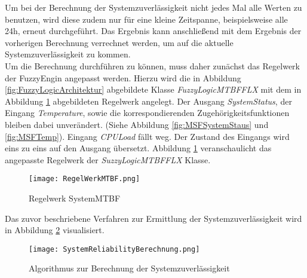Um bei der Berechnung der Systemzuverlässigkeit nicht jedes Mal alle Werten zu benutzen, wird diese zudem nur für eine kleine Zeitspanne, beispielsweise alle 24h, erneut durchgeführt. Das Ergebnis kann anschließend mit dem Ergebnis der vorherigen Berechnung verrechnet werden, um auf die aktuelle Systemzuverlässigkeit zu kommen.\\
Um die Berechnung durchführen zu können, muss daher zunächst das Regelwerk der FuzzyEngin angepasst werden. Hierzu wird die in Abbildung \ref{fig:FuzzyLogicArchitektur} abgebildete Klasse \textit{FuzzyLogicMTBFFLX} mit dem in Abbildung \ref{fig:SystemMTBF} abgebildeten Regelwerk angelegt. Der Ausgang \textit{SystemStatus}, der Eingang \textit{Temperature}, sowie die korrespondierenden Zugehörigkeitsfunktionen bleiben dabei unverändert. (Siehe Abbildung \ref{fig:MSFSystemStaus} und \ref{fig:MSFTemp}). Eingang \textit{CPULoad} fällt weg. Der Zustand des Eingangs wird eins zu eins auf den Ausgang übersetzt. Abbildung \ref{fig:SystemMTBF} veranschaulicht das angepasste Regelwerk der \textit{SuzzyLogicMTBFFLX} Klasse.
\begin{center}
    \begin{figure}[h!]
        \captionsetup{justification=centering,format=plain, font=small}
        \centering
        \texttt{[image: RegelWerkMTBF.png]}
        \caption{Regelwerk SystemMTBF}
        \label{fig:SystemMTBF}
    \end{figure}
\end{center}
\vspace{-0.5cm}
Das zuvor beschriebene Verfahren zur Ermittlung der Systemzuverlässigkeit wird in Abbildung \ref{fig:AblaufdiagramSystemReliability} visualisiert.
\begin{center}
    \begin{figure}[h!]
        \captionsetup{justification=centering,format=plain, font=small}
        \centering
        \texttt{[image: SystemReliabilityBerechnung.png]}
        \caption{Algorithmus zur Berechnung der Systemzuverlässigkeit}
        \label{fig:AblaufdiagramSystemReliability}
    \end{figure}
\end{center}

